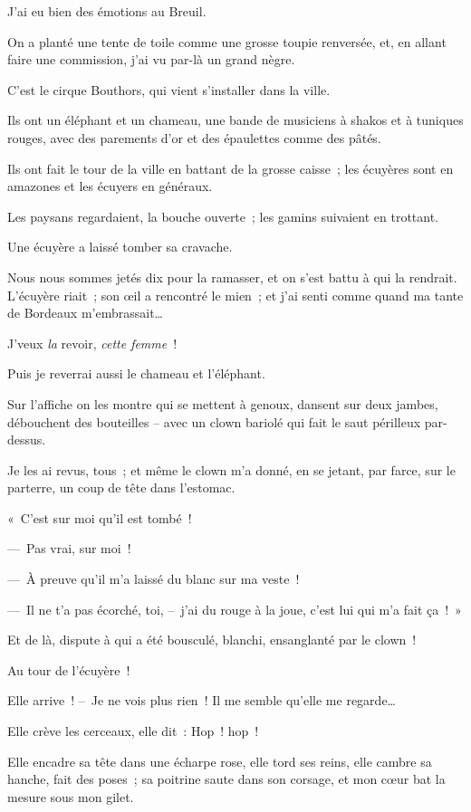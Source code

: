 \documentclass[french,twoside]{book} %
\begin{document}
\noindent J’ai eu bien des émotions au Breuil.\par
On a planté une tente de toile comme une grosse toupie renversée, et, en allant faire une commission, j’ai vu par-là un grand nègre.\par
C’est le cirque Bouthors, qui vient s’installer dans la ville.\par
Ils ont un éléphant et un chameau, une bande de musiciens à shakos et à tuniques rouges, avec des parements d’or et des épaulettes comme des pâtés.\par
Ils ont fait le tour de la ville en battant de la grosse caisse ; les écuyères sont en amazones et les écuyers en généraux.\par
Les paysans regardaient, la bouche ouverte ; les gamins suivaient en trottant.\par
Une écuyère a laissé tomber sa cravache.\par
Nous nous sommes jetés dix pour la ramasser, et on s’est battu à qui la rendrait. L’écuyère riait ; son œil a rencontré le mien ; et j’ai senti comme quand ma tante de Bordeaux m’embrassait…\par
J’veux \emph{la} revoir, \emph{cette femme} !\par
Puis je reverrai aussi le chameau et l’éléphant.\par
Sur l’affiche on les montre qui se mettent à genoux, dansent sur deux jambes, débouchent des bouteilles – avec un clown bariolé qui fait le saut périlleux par-dessus.\par
Je les ai revus, tous ; et même le clown m’a donné, en se jetant, par farce, sur le parterre, un coup de tête dans l’estomac.\par
\bigbreak
\noindent « C’est sur moi qu’il est tombé !\par
— Pas vrai, sur moi !\par
— À preuve qu’il m’a laissé du blanc sur ma veste !\par
— Il ne t’a pas écorché, toi, – j’ai du rouge à la joue, c’est lui qui m’a fait ça ! »\par
Et de là, dispute à qui a été bousculé, blanchi, ensanglanté par le clown !\par
\bigbreak
\noindent Au tour de l’écuyère !\par
Elle arrive ! – Je ne vois plus rien ! Il me semble qu’elle me regarde…\par
Elle crève les cerceaux, elle dit : Hop ! hop !\par
Elle encadre sa tête dans une écharpe rose, elle tord ses reins, elle cambre sa hanche, fait des poses ; sa poitrine saute dans son corsage, et mon cœur bat la mesure sous mon gilet.\par
\end{document}
